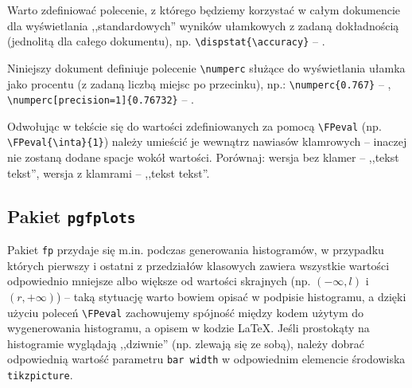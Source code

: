 \documentclass[pdftex,11pt,a4paper]{article}
\begin{document}


\FPeval{\accuracy}{\ncorrect / (\ncorrect + \nincorrect)}

\par\bigskip

Warto zdefiniować polecenie, z którego będziemy korzystać w całym dokumencie dla wyświetlania ,,standardowych'' wyników ułamkowych z zadaną dokładnością (jednolitą dla całego dokumentu), \linebreak np. \lstinline|\dispstat{\accuracy}| -- \dispstat{\accuracy}.

Niniejszy dokument definiuje polecenie \lstinline|\numperc| służące do wyświetlania ułamka jako procentu (z zadaną liczbą miejsc po przecinku), np.: \lstinline|\numperc{0.767}| -- , \lstinline|\numperc[precision=1]{0.76732}| -- .








Odwołując w tekście się do wartości zdefiniowanych za pomocą \lstinline|\FPeval| (np. \lstinline|\FPeval{\inta}{1}|) należy umieścić je wewnątrz nawiasów klamrowych -- inaczej nie zostaną dodane spacje wokół wartości. Porównaj: wersja bez klamer -- ,,tekst \inta tekst'', wersja z klamrami -- ,,tekst {\inta} tekst''.

\subsection{Pakiet \lstinline|pgfplots|}
\label{sub:pgfplots}

Pakiet \lstinline|fp| przydaje się m.in. podczas generowania histogramów, w przypadku których pierwszy i ostatni z przedziałów klasowych zawiera wszystkie wartości odpowiednio mniejsze albo większe od wartości skrajnych (np. $(-\infty, l)$ i $(r, +\infty)$) -- taką stytuację warto bowiem opisać w podpisie histogramu, a dzięki użyciu poleceń \lstinline|\FPeval| zachowujemy spójność między kodem użytym do wygenerowania histogramu, a opisem w kodzie \LaTeX.
%
Jeśli prostokąty na histogramie wyglądają ,,dziwnie'' (np. zlewają się ze sobą), należy dobrać odpowiednią wartość parametru \lstinline|bar width| w odpowiednim elemencie środowiska \lstinline|tikzpicture|.
\end{document}
